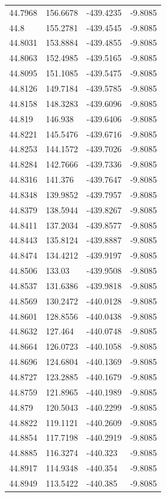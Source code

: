 \begin{table}[H]
\begin{tabular}{llll}
44.7968 & 156.6678 & -439.4235 & -9.8085 \\
44.8 & 155.2781 & -439.4545 & -9.8085 \\
44.8031 & 153.8884 & -439.4855 & -9.8085 \\
44.8063 & 152.4985 & -439.5165 & -9.8085 \\
44.8095 & 151.1085 & -439.5475 & -9.8085 \\
44.8126 & 149.7184 & -439.5785 & -9.8085 \\
44.8158 & 148.3283 & -439.6096 & -9.8085 \\
44.819 & 146.938 & -439.6406 & -9.8085 \\
44.8221 & 145.5476 & -439.6716 & -9.8085 \\
44.8253 & 144.1572 & -439.7026 & -9.8085 \\
44.8284 & 142.7666 & -439.7336 & -9.8085 \\
44.8316 & 141.376 & -439.7647 & -9.8085 \\
44.8348 & 139.9852 & -439.7957 & -9.8085 \\
44.8379 & 138.5944 & -439.8267 & -9.8085 \\
44.8411 & 137.2034 & -439.8577 & -9.8085 \\
44.8443 & 135.8124 & -439.8887 & -9.8085 \\
44.8474 & 134.4212 & -439.9197 & -9.8085 \\
44.8506 & 133.03 & -439.9508 & -9.8085 \\
44.8537 & 131.6386 & -439.9818 & -9.8085 \\
44.8569 & 130.2472 & -440.0128 & -9.8085 \\
44.8601 & 128.8556 & -440.0438 & -9.8085 \\
44.8632 & 127.464 & -440.0748 & -9.8085 \\
44.8664 & 126.0723 & -440.1058 & -9.8085 \\
44.8696 & 124.6804 & -440.1369 & -9.8085 \\
44.8727 & 123.2885 & -440.1679 & -9.8085 \\
44.8759 & 121.8965 & -440.1989 & -9.8085 \\
44.879 & 120.5043 & -440.2299 & -9.8085 \\
44.8822 & 119.1121 & -440.2609 & -9.8085 \\
44.8854 & 117.7198 & -440.2919 & -9.8085 \\
44.8885 & 116.3274 & -440.323 & -9.8085 \\
44.8917 & 114.9348 & -440.354 & -9.8085 \\
44.8949 & 113.5422 & -440.385 & -9.8085 \\

\end{tabular}
\end{table}
